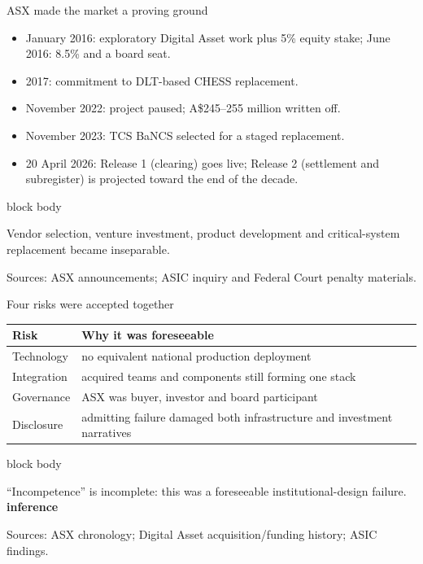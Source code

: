 \documentclass[aspectratio=169,12pt]{beamer}
\newcommand{\source}[1]{\vfill\par\fontsize{5.4}{6.5}\selectfont\color{Quiet}Sources: #1}
\newcommand{\tightitems}{\setlength{\itemsep}{0.42em}\setlength{\parskip}{0pt}}
\newcommand{\tinf}{\textcolor{Ocean}{\bfseries inference}}
\newenvironment{statement}{%
  \begin{beamercolorbox}[sep=.18cm,rounded=false,wd=\linewidth]{block body}%
  \fontsize{13}{15.5}\selectfont\bfseries
}{\end{beamercolorbox}}
\begin{document}
\begin{frame}{ASX made the market a proving ground}
  \begin{itemize}\tightitems
    \item January 2016: exploratory Digital Asset work plus 5\% equity stake; June 2016: 8.5\% and a board seat.
    \item 2017: commitment to DLT-based CHESS replacement.
    \item November 2022: project paused; A\$245--255 million written off.
    \item November 2023: TCS BaNCS selected for a staged replacement.
    \item 20 April 2026: Release 1 (clearing) goes live; Release 2 (settlement and subregister) is projected toward the end of the decade.
  \end{itemize}
  \begin{statement}
    Vendor selection, venture investment, product development and critical-system replacement became inseparable.
  \end{statement}
  \source{ASX announcements; ASIC inquiry and Federal Court penalty materials.}
\end{frame}

\begin{frame}{Four risks were accepted together}
  \begin{tabularx}{\textwidth}{L{2.2cm}Y}
    \toprule
    \textbf{Risk} & \textbf{Why it was foreseeable} \\
    \midrule
    Technology & no equivalent national production deployment \\
    Integration & acquired teams and components still forming one stack \\
    Governance & ASX was buyer, investor and board participant \\
    Disclosure & admitting failure damaged both infrastructure and investment narratives \\
    \bottomrule
  \end{tabularx}
  \begin{statement}
    ``Incompetence'' is incomplete: this was a foreseeable institutional-design failure. \hfill\tinf
  \end{statement}
  \source{ASX chronology; Digital Asset acquisition/funding history; ASIC findings.}
\end{frame}
\end{document}
